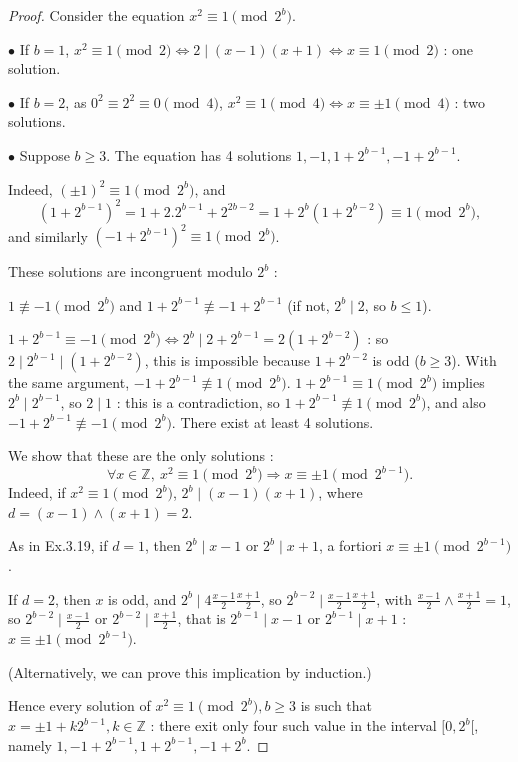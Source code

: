\documentclass[11pt,a4paper]{article}
\newcommand{\Z}{\mathbb{Z}}
\begin{document}
{\begin{proof} Consider the equation $x^2 \equiv 1\pmod{2^b}$.

$\bullet$ If $b=1$, $x^2 \equiv 1\pmod{2} \iff 2 \mid (x-1)(x+1) \iff x\equiv 1 \pmod 2$ : one solution.

$\bullet$ If $b=2$, as $0^2 \equiv 2^2 \equiv 0 \pmod 4$, $x^2 \equiv 1\pmod{4} \iff x\equiv \pm 1 \pmod 4$ : two solutions.

$\bullet$ Suppose $b\geq 3$. The equation has 4 solutions $1,-1,1+2^{b-1}, -1+2^{b-1}$.

Indeed, $(\pm1)^2 \equiv 1 \pmod {2^b}$, and
$$(1+2^{b-1})^2 = 1 + 2.2^{b-1} + 2^{2b-2} = 1+2^b(1+2^{b-2}) \equiv 1 \pmod{2^b},$$ and similarly $(-1+2^{b-1})^2 \equiv 1 \pmod{2^b}$.

These solutions are incongruent modulo $2^b$ : 

$1 \not \equiv -1 \pmod {2^b}$ and $1+2^{b-1}\not \equiv -1+2^{b-1}$ (if not, $2^b \mid 2$, so $b\leq 1$).

$1 + 2^{b-1} \equiv -1 \pmod {2^b} \iff 2^b \mid 2 +2^{b-1} = 2(1 + 2^{b-2})$ : so  $2 \mid 2^{b-1} \mid (1+ 2^{b-2})$, this is impossible because $1+ 2^{b-2}$ is odd ($b\geq 3$). With the same argument, $-1 + 2^{b-1} \not \equiv 1 \pmod{2^b}$. $1 + 2^{b-1} \equiv 1  \pmod{2^b}$ implies $2^{b} \mid 2^{b-1}$, so $2\mid 1$ : this is a contradiction, so $1 + 2^{b-1} \not \equiv 1  \pmod{2^b}$, and also $-1 + 2^{b-1} \not \equiv -1  \pmod{2^b}$. There exist at least 4 solutions.

We show that these are the only solutions : 
$$ \forall x \in \Z,\ x^2 \equiv 1 \pmod{2^b} \Rightarrow x \equiv \pm 1 \pmod{2^{b-1}}.$$
Indeed, if $x^2 \equiv 1 \pmod{2^b} $, $2^b \mid (x-1)(x+1)$, where $d =(x-1) \wedge (x+1) = 2$. 

As in Ex.3.19, if $d=1$, then $2^b \mid x-1$ or $2^b \mid x+1$, a fortiori $x \equiv \pm 1 \pmod{2^{b-1}}$.

If $d=2$, then $x$ is odd, and $2^b \mid 4\frac{x-1}{2}\frac{x+1}{2}$,  so $2^{b-2} \mid \frac{x-1}{2}\frac{x+1}{2}$, with $\frac{x-1}{2} \wedge \frac{x+1}{2}=1$, so $2^{b-2} \mid \frac{x-1}{2}$ or $2^{b-2} \mid \frac{x+1}{2}$, that is $2^{b-1} \mid x-1$ or $2^{b-1} \mid x+1$ : $x \equiv \pm 1 \pmod{2^{b-1}}$.

(Alternatively, we can prove this implication by induction.)

Hence every solution of $x^2 \equiv 1\pmod{2^b}, b\geq 3$ is such that $x = \pm1+k2^{b-1}, k \in \Z$ : there exit only four such value in the interval $[0,2^b[$, namely $1,-1+2^{b-1},1+2^{b-1},-1+2^b$.


\end{proof}}
\end{document}
